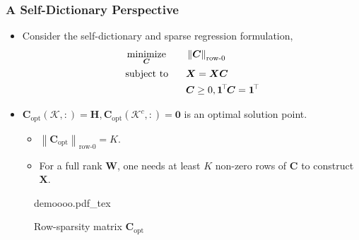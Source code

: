 \documentclass[10pt,xcolor={usenames,dvipsnames,table}]{beamer}
\def\blue{\color{blue}}
\newcommand{\norm}[1]{\left\lVert#1\right\rVert}
\newcommand{\T}{\!\top\!}
\newcommand{\incfig}[2][1]{%
    \def\svgwidth{#1\columnwidth}
    {#2.pdf_tex}
}
\DeclareMathOperator*{\minimize}{minimize}
\newcommand{\citep}[1]{{\blue \scriptsize \parencite{#1}}}
\begin{document}
\begin{frame}
    \frametitle{A Self-Dictionary Perspective}

    \begin{itemize}
        \item Consider the self-dictionary and sparse regression formulation,
            \citep{iordache2014collaborative,esser2012convex,recht2012factoring,Elhamifar2012}
    \begin{alignat*}{2}
        & \minimize_{\bm{C}} \quad && \norm{\bm{C}}_{\text{row-}0}  \\
        & \text{\rm subject to} && \bm{X} = \bm{X} \bm{C} \\
        &&& \bm{C} \geq 0, \bm{1}^{\T}\bm{C} = \bm{1}^{\T}
    \end{alignat*}

        \item $\bm{C}_{\text{opt}}(\mathcal{K}, :) = \bm{H}, \bm{C}_{\text{opt}}(\mathcal{K}^{c}, :) = \bm{0}$ is an optimal solution point.
        \begin{itemize}
        \item $\norm{\bm{C}_\text{opt}}_{\text{row-}0} = K$.
        \item For a full rank $\bm{W}$, one needs at least $K$ non-zero rows of $\bm{C}$ to construct $\bm{X}$.
        \end{itemize}
    \end{itemize}


\begin{figure}[ht]
    \centering
    \incfig[0.9]{demoooo}
    \caption*{Row-sparsity matrix $\bm{C}_{\text{opt}}$ }
    \label{fig:demoooo}
\end{figure}


\end{frame}
\end{document}

